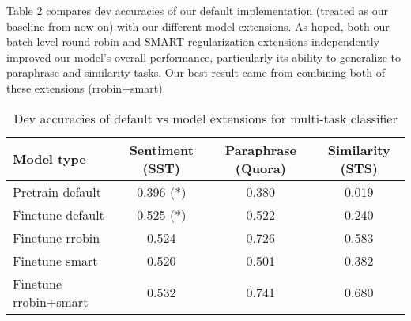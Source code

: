 \documentclass{article}
\begin{document}
Table 2 compares dev accuracies of our default implementation (treated as our baseline from now on) with our different model extensions. As hoped, both our batch-level round-robin and SMART regularization extensions independently improved our model's overall performance, particularly its ability to generalize to paraphrase and similarity tasks. Our best result came from combining both of these extensions (rrobin+smart). 
\begin{table}[h]
\centering
\begin{tabular}{|l|ccc|}
\hline
Model type            & Sentiment (SST) & Paraphrase (Quora) & Similarity (STS) \\ \hline
Pretrain default      & 0.396 (*)          & 0.380              & 0.019            \\
Finetune default      & 0.525 (*)          & 0.522              & 0.240            \\
Finetune rrobin       & 0.524              & 0.726              & 0.583            \\
Finetune smart        & 0.520              & 0.501              & 0.382            \\
Finetune rrobin+smart & 0.532              & 0.741              & 0.680            \\ \hline
\end{tabular}
\caption{Dev accuracies of default vs model extensions for multi-task classifier }
\end{table}

\end{document}
